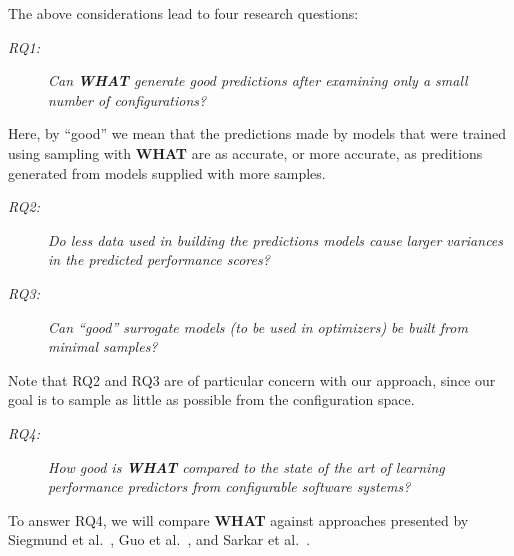 \documentclass[smallextended]{svjour3}       %
\newcommand{\what}{{\bf WHAT}\xspace}
\begin{document}
The above considerations lead to four research questions:
\begin{description}
\item[{\em RQ1:}] {\em Can  \what generate good predictions after
examining only a small number of configurations?}
\end{description}
Here, by ``good'' we mean that the predictions made by models that were trained using sampling with \what are as accurate, or more accurate,
as preditions generated from models supplied with more samples.
\begin{description}
\item[{\em RQ2:}] {\em
Do less data used in building the predictions models cause larger variances in the predicted performance scores?}
\item[{\em RQ3:}] {\em
Can ``good'' surrogate models (to be used in optimizers)
be built from minimal samples?}
\end{description}
Note that RQ2 and RQ3 are of particular concern with our approach,
since our goal is to sample as little as possible from the configuration space.
\begin{description}
\item[{\em RQ4:}] {\em How good is \what compared to the state of the art of
learning performance predictors from configurable software systems?}
\end{description}

\noindent To answer RQ4, we will compare \what 
          against approaches presented by Siegmund et al.~\cite{siegmund2012predicting}, Guo et al.~\cite{guo2013variability}, and Sarkar et al.~\cite{sarkar2015cost}.
 
\end{document}
